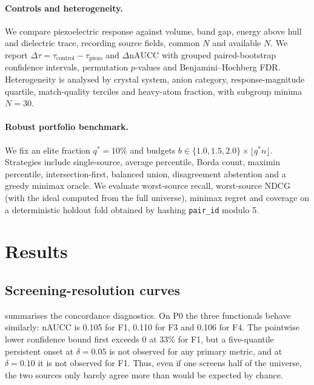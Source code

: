 \documentclass[11pt]{article}
\begin{document}
\paragraph{Controls and heterogeneity.}
We compare piezoelectric response against volume, band gap, energy above hull and dielectric trace, recording source fields, common $N$ and available $N$.
We report $\Delta\tau = \tau_{\text{control}} - \tau_{\text{piezo}}$ and $\Delta\mathrm{nAUCC}$ with grouped paired-bootstrap confidence intervals, permutation $p$-values and Benjamini--Hochberg FDR.
Heterogeneity is analysed by crystal system, anion category, response-magnitude quartile, match-quality terciles and heavy-atom fraction, with subgroup minima $N=30$.

\paragraph{Robust portfolio benchmark.}
We fix an elite fraction $q^*=10\%$ and budgets $b \in \{1.0,1.5,2.0\} \times \lfloor q^* n \rfloor$.
Strategies include single-source, average percentile, Borda count, maximin percentile, intersection-first, balanced union, disagreement abstention and a greedy minimax oracle.
We evaluate worst-source recall, worst-source NDCG (with the ideal computed from the full universe), minimax regret and coverage on a deterministic holdout fold obtained by hashing \texttt{pair\_id} modulo 5.

\section{Results}
\label{sec:results}
\subsection{Screening-resolution curves}
 summarises the concordance diagnostics.
On P0 the three functionals behave similarly: nAUCC is 0.105 for F1, 0.110 for F3 and 0.106 for F4.
The pointwise lower confidence bound first exceeds 0 at 33\% for F1, but a five-quantile persistent onset at $\delta=0.05$ is not observed for any primary metric, and at $\delta=0.10$ it is not observed for F1.
Thus, even if one screens half of the universe, the two sources only barely agree more than would be expected by chance.
\end{document}
